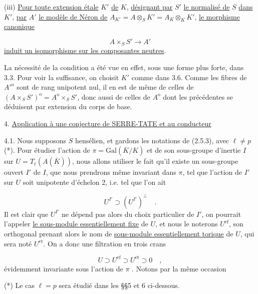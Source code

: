 (iii) \quad \underline{Pour toute extension étale} $K'$ \underline{de} $K$, \underline{désignant par} $S'$ \underline{le normalisé de} $S$ \underline{dans} $K'$, \underline{par} $A'$ \underline{le modèle de Néron de} $A_{K'} = A\otimes_S K'=A_K\otimes_K K'$, \underline{le morphisme canonique}



\begin{equation*}
A\times_S S' \longrightarrow A'
\end{equation*}
\underline{induit un isomorphisme sur les composantes neutres}.

La nécessité de la condition a été vue en effet, sous une forme plus forte, dans 3.3. Pour voir la suffisance, on choisit $K'$ comme dans 3.6. Comme les fibres de ${A'}^{\mathrm{o}}$ sont de rang unipotent nul, il en est de même de celles de $(A\times_S S')^{\mathrm{o}} = A^{\mathrm{o}}\times_S S'$, donc aussi de celles de $A^{\mathrm{o}}$ dont les précédentes se déduisent par extension du corps de base.


4. \underline{Application à une conjecture de SERRE-TATE et au conducteur}

4.1. \quad Nous supposons $S$ hensélien, et gardons les notations de (2.5.3), avec $\ell \neq p$ (*). Pour étudier l'action de $\pi = \mathrm{Gal}(\overline{K}/K)$ et de son sous-groupe d'inertie $I$ sur $U = T_\ell(A(\overline{K}))$, nous allons utiliser le fait qu'il existe un sous-groupe ouvert $I'$ de $I$, que nous prendrons même invariant dans $\pi$, tel que l'action de $I'$ sur $U$ soit unipotente d'échelon 2, i.e. tel que l'on ait

\begin{equation*}
U^{I'} \supset (U^{I'})^{\perp} \quad .
\end{equation*}
Il est clair que $U^{I'}$ ne dépend pas alors du choix particulier de $I'$, on pourrait l'appeler \underline{le sous-module essentiellement fixe} de $U$, et nous le noterons $U^{\mathrm{ef}}$, son orthogonal prenant alors le nom de \underline{sous-module essentiellement torique} de $U$, qui sera noté $U^{\mathrm{et}}$. On a donc une filtration en trois crans

\begin{equation}\tag{4.1.1}
U \supset U^{\mathrm{ef}} \supset U^{\mathrm{et}} \supset 0 \quad ,
\end{equation}
évidemment invariante sous l'action de $\pi$ . Notons par la même occasion

(*) Le cas $\ell = p$ sera étudié dans les \S\S 5 et 6 ci-dessous.


